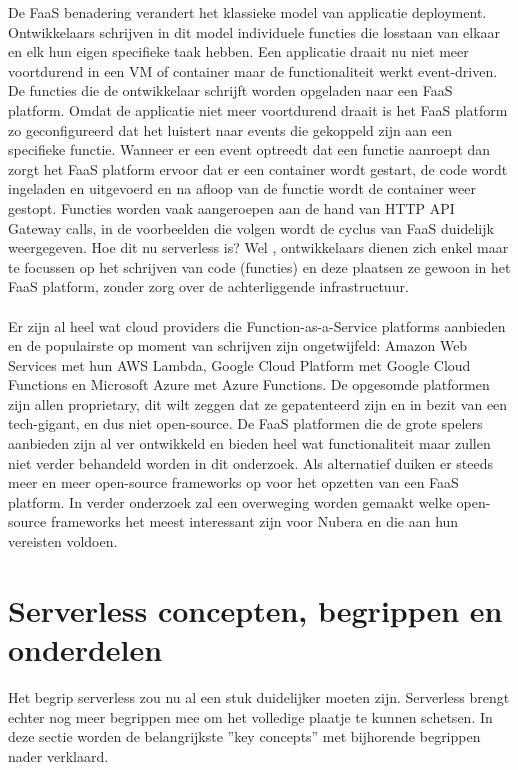 De FaaS benadering verandert het klassieke model van applicatie deployment. Ontwikkelaars schrijven in dit model individuele functies die losstaan van elkaar en elk hun eigen specifieke taak hebben. Een applicatie draait nu niet meer voortdurend in een VM of container maar de functionaliteit werkt event-driven. De functies die de ontwikkelaar schrijft worden opgeladen naar een FaaS platform. Omdat de applicatie niet meer voortdurend draait is het FaaS platform zo geconfigureerd dat het luistert naar events die gekoppeld zijn aan een specifieke functie. Wanneer er een event optreedt dat een functie aanroept dan zorgt het FaaS platform ervoor dat er een container wordt gestart, de code wordt ingeladen en uitgevoerd en na afloop van de functie wordt de container weer gestopt. Functies worden vaak aangeroepen aan de hand van HTTP API Gateway calls, in de voorbeelden die volgen wordt de cyclus van FaaS duidelijk weergegeven. Hoe dit nu serverless is? Wel , ontwikkelaars dienen zich enkel maar te focussen op het schrijven van code (functies) en deze plaatsen ze gewoon in het FaaS platform, zonder zorg over de achterliggende infrastructuur.\autocite{Roberts2017}
\\\\
Er zijn al heel wat cloud providers die Function-as-a-Service platforms aanbieden en de populairste op moment van schrijven zijn ongetwijfeld: Amazon Web Services met hun AWS Lambda, Google Cloud Platform met Google Cloud Functions en Microsoft Azure met Azure Functions. De opgesomde platformen zijn allen proprietary,  dit wilt zeggen dat ze gepatenteerd zijn en in bezit van een tech-gigant, en dus niet open-source. De FaaS platformen die de grote spelers aanbieden zijn al ver ontwikkeld en bieden heel wat functionaliteit maar zullen niet verder behandeld worden in dit onderzoek. Als alternatief duiken er steeds meer en meer open-source frameworks op voor het opzetten van een FaaS platform. In verder onderzoek zal een overweging worden gemaakt welke  open-source frameworks het meest interessant zijn voor Nubera en die aan hun vereisten voldoen.

\section{Serverless concepten, begrippen en onderdelen}
Het begrip serverless zou nu al een stuk duidelijker moeten zijn. Serverless brengt echter nog meer begrippen mee om het volledige plaatje te kunnen schetsen. In deze sectie worden de belangrijkste ''key concepts'' met bijhorende begrippen nader verklaard.


